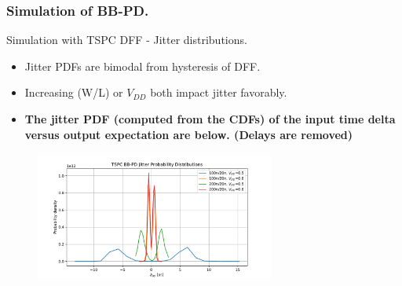 \documentclass[t, screen, aspectratio=43]{beamer}
\begin{document}
\begin{frame}
	\frametitle{Simulation of BB-PD.}
	\begin{block}{Simulation with TSPC DFF - Jitter distributions.}
	\tiny
	\begin{itemize}[itemsep=4pt,label=\protect---]
		\item Jitter PDFs are bimodal from hysteresis of DFF. 
		\item Increasing (W/L) or $V_{DD}$ both impact jitter favorably.
		\item \textbf{The jitter PDF (computed from the CDFs) of the input time delta versus output expectation are below. (Delays are removed)}
	\end{itemize}
	\vspace{-2em}
	\begin{figure}[htb!]
	    \centering
		\includegraphics[width=0.7\textwidth, angle=0]{jitter_pdfs.pdf}
	\end{figure}
	\end{block}	
\end{frame}
\end{document}

